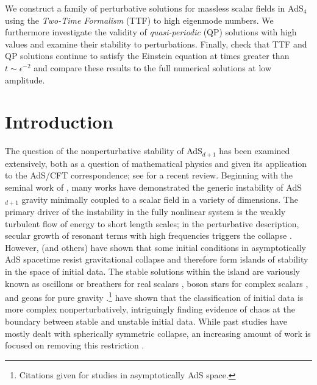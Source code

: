 \documentclass[../PhD.tex]{subfiles}
\begin{document}
\bigskip

We construct a family of perturbative solutions for massless scalar fields in AdS$_4$ using the \emph{Two-Time Formalism} (TTF) to high eigenmode numbers. We furthermore investigate the validity of \emph{quasi-periodic} (QP) solutions with high \jm values and examine their stability to perturbations. Finally, check that TTF and QP solutions continue to satisfy the Einstein equation at times greater than $t \sim \epsilon^{-2}$ and compare these results to the full numerical solutions at low amplitude.


\section{Introduction}

The question of the nonperturbative stability of AdS$_{d+1}$ has been examined extensively, both as a question of mathematical physics and given its application to the AdS/CFT correspondence; see \cite{1708.05600} for a recent review. Beginning with the seminal work of \cite{1104.3702}, many works \cite{1108.4539, 1106.2339, 1110.5823, 1210.0890, 1510.02592} have demonstrated the generic instability of AdS$_{d+1}$ gravity minimally coupled to a scalar field in a variety of dimensions. The primary driver of the instability in the fully nonlinear system is the weakly turbulent flow of energy to short length scales; in the perturbative description, secular growth of resonant terms with high frequencies triggers the collapse \cite{1109.1825, 1306.0317, 1312.5544}. However, \cite{1303.3186, 1307.2875, 1403.5434} (and others) have shown that some initial conditions in asymptotically AdS spacetime resist gravitational collapse and therefore form islands of stability in the space of initial data.  The stable solutions within the island are variously known as oscillons or breathers for real scalars \cite{1104.3702,1210.0890,1303.3186,1503.07746}, boson stars for complex scalars \cite{1304.4166,1307.2875}, and geons for pure gravity \cite{1109.1825,1208.5772}.\footnote{Citations given for studies in asymptotically AdS space.} \cite{1508.02709, 1711.00454,1602.03535} have shown that the classification of initial data is more complex nonperturbatively, intriguingly finding evidence of chaos at the boundary between stable and unstable initial data. While past studies have mostly dealt with spherically symmetric collapse, an increasing amount of work is focused on removing this restriction \cite{1602.03890,1705.03065, 1706.06101}.
\end{document}
